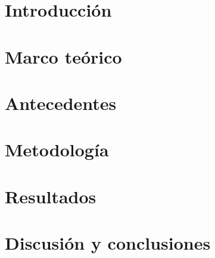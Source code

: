 \documentclass[12pt,letterpaper]{report}
\begin{document}


\tableofcontents
\newpage
\listoffigures

\newpage
{}

\chapter{Introducción}


\chapter{Marco teórico}


\chapter{Antecedentes}


\chapter{Metodología}


\chapter{Resultados}


\chapter{Discusión y conclusiones}


%

\renewcommand{\bibname}{Referencias}


\end{document}
